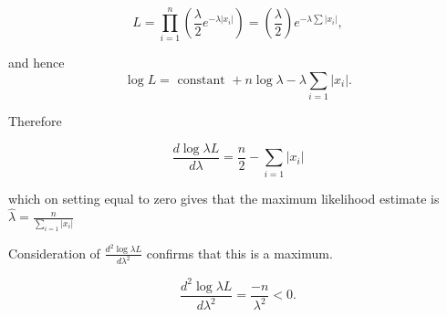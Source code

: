 \documentclass[a4paper,12pt]{article}
\begin{document}
\[L = \prod^{n}_{i=1} \left( \frac{\lambda}{2} e^{-\lambda|x_i|}  \right)  = \left( \frac{\lambda}{2}  \right) e^{-\lambda \sum|x_i|},\]

and hence 
\[ \log L = \mbox{ constant }+ n \log \lambda − \lambda \sum_{i=1} |x_i| .\]

Therefore

\[  \frac{d \log \lambda L}{d \lambda} = \frac{n}{2} - \sum_{i=1} |x_i|  \]

which on setting equal to zero gives that the maximum
likelihood estimate is $ { \displaystyle \hat{\lambda} = \frac{n}{\sum_{i=1} |x_i|}  }$

Consideration of $ { \displaystyle  \frac{d^2 \log \lambda L}{d \lambda^2} }$ confirms that this is a maximum.

\[ \frac{d^2 \log \lambda L}{d \lambda^2} = \frac{-n}{\lambda^2} <0.\]
\end{document}
